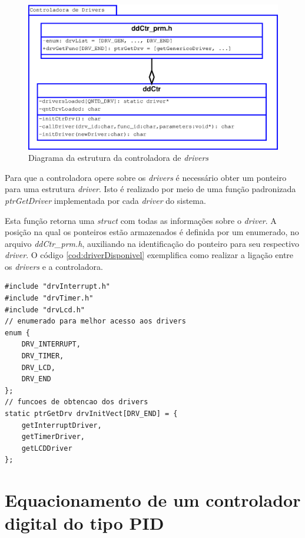 \documentclass[12pt,openright,oneside,a4paper,brazil]{abntex2}
\begin{document}
\begin{figure}[htbp]
	\begin{center}
	\includegraphics[width=12cm]{uml/umlControladora.eps}
	\caption{Diagrama da estrutura da controladora de \textit{drivers}}
	\label{fig:ddctr}
	\end{center}
\end{figure}

Para que a controladora opere sobre os \textit{drivers} é necessário obter um ponteiro para uma estrutura \textit{driver}. Isto é realizado por meio de uma função padronizada \textit{ptrGetDriver} implementada por cada \textit{driver} do sistema.

Esta função retorna uma \textit{struct} com todas as informações sobre o \textit{driver}. A posição na qual os ponteiros estão armazenados é definida por um enumerado, no arquivo \textit{ddCtr\_prm.h}, auxiliando na identificação do ponteiro para seu respectivo \textit{driver}. O código \ref{cod:driverDisponivel} exemplifica como realizar a ligação entre os \textit{drivers} e a controladora.

\begin{lstlisting}[float=h,caption=Definição dos \textit{drivers} disponíveis para uso,label=cod:driverDisponivel]
#include "drvInterrupt.h"
#include "drvTimer.h"
#include "drvLcd.h"
// enumerado para melhor acesso aos drivers
enum {
	DRV_INTERRUPT,
	DRV_TIMER,
	DRV_LCD,
	DRV_END
};
// funcoes de obtencao dos drivers
static ptrGetDrv drvInitVect[DRV_END] = {
	getInterruptDriver,
	getTimerDriver,
	getLCDDriver
};
\end{lstlisting}


\chapter{Equacionamento de um controlador digital do tipo PID}\label{chap:pid}
\end{document}
